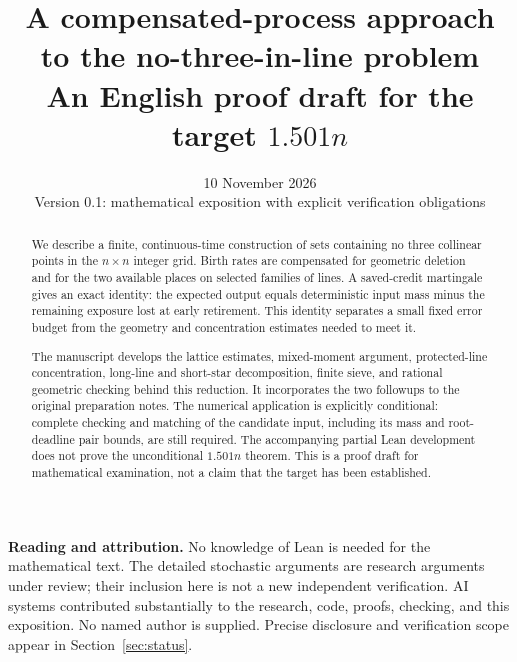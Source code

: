 \documentclass[11pt,a4paper]{article}
\title{\textbf{A compensated-process approach\\to the no-three-in-line problem}\\[5pt]
\large An English proof draft for the target \(1.501n\)}
\author{}
\date{10 November 2026\\[3pt]\small Version 0.1: mathematical exposition with explicit verification obligations}
\theoremstyle{definition}
\begin{document}
\maketitle
\begin{abstract}
We describe a finite, continuous-time construction of sets containing no three
collinear points in the \(n\times n\) integer grid. Birth rates are compensated
for geometric deletion and for the two available places on selected families
of lines. A saved-credit martingale gives an exact identity: the expected
output equals deterministic input mass minus the remaining exposure lost at
early retirement. This identity separates a small fixed error budget from
the geometry and concentration estimates needed to meet it.

The manuscript develops the lattice estimates, mixed-moment argument,
protected-line concentration, long-line and short-star decomposition,
finite sieve, and rational geometric checking behind this reduction.
It incorporates the two followups to the original preparation notes.
The numerical application is explicitly conditional: complete checking and
matching of the candidate input, including its mass and root-deadline pair
bounds, are still required. The accompanying partial Lean development does
not prove the unconditional \(1.501n\) theorem. This is a proof draft for
mathematical examination, not a claim that the target has been established.
\end{abstract}
\noindent\textbf{Reading and attribution.}
No knowledge of Lean is needed for the mathematical text.
The detailed stochastic arguments are research arguments under review;
their inclusion here is not a new independent verification.
AI systems contributed substantially to the research, code, proofs, checking,
and this exposition. No named author is supplied. Precise disclosure and
verification scope appear in Section~\ref{sec:status}.
\tableofcontents
\newpage






\end{document}
